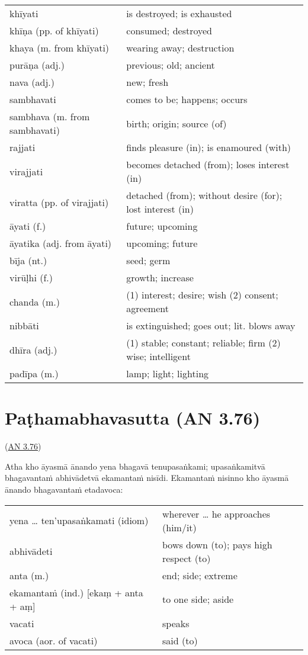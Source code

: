\documentclass[11pt,oneside]{memoir}
\begin{document}
\begin{longtable}{L{\colOne} L{\colTwo}}
khīyati & is destroyed; is exhausted\\[0pt]
khīṇa (pp. of khīyati) & consumed; destroyed\\[0pt]
khaya (m. from khīyati) & wearing away; destruction\\[0pt]
purāṇa (adj.) & previous; old; ancient\\[0pt]
nava (adj.) & new; fresh\\[0pt]
sambhavati & comes to be; happens; occurs\\[0pt]
sambhava (m. from sambhavati) & birth; origin; source (of)\\[0pt]
rajjati & finds pleasure (in); is enamoured (with)\\[0pt]
virajjati & becomes detached (from); loses interest (in)\\[0pt]
viratta (pp. of virajjati) & detached (from); without desire (for); lost interest (in)\\[0pt]
āyati (f.) & future; upcoming\\[0pt]
āyatika (adj. from āyati) & upcoming; future\\[0pt]
bīja (nt.) & seed; germ\\[0pt]
virūḷhi (f.) & growth; increase\\[0pt]
chanda (m.) & (1) interest; desire; wish (2) consent; agreement\\[0pt]
nibbāti & is extinguished; goes out; lit. blows away\\[0pt]
dhīra (adj.) & (1) stable; constant; reliable; firm (2) wise; intelligent\\[0pt]
padīpa (m.) & lamp; light; lighting\\[0pt]
\end{longtable}

\chapter{Paṭhamabhavasutta (AN 3.76)}
\label{sec:org47970d1}

(\href{https://suttacentral.net/an3.76/en/sujato}{AN 3.76})

\begin{spacedquote}
Atha kho āyasmā ānando yena bhagavā tenupasaṅkami; upasaṅkamitvā bhagavantaṁ
abhivādetvā ekamantaṁ nisīdi. Ekamantaṁ nisinno kho āyasmā ānando bhagavantaṁ
etadavoca:
\end{spacedquote}

\begin{longtable}{L{\colOne} L{\colTwo}}
yena \ldots{} ten'upasaṅkamati (idiom) & wherever \ldots{} he approaches (him/it)\\[0pt]
abhivādeti & bows down (to); pays high respect (to)\\[0pt]
anta (m.) & end; side; extreme\\[0pt]
ekamantaṁ (ind.) [ekaṃ + anta + aṃ] & to one side; aside\\[0pt]
vacati & speaks\\[0pt]
avoca (aor. of vacati) & said (to)\\[0pt]
\end{longtable}
\end{document}
